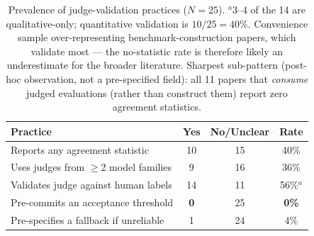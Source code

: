 \documentclass{article}
\begin{document}
\begin{table}[h]
\centering
\small
\begin{tabular}{lccc}
\toprule
Practice & Yes & No/Unclear & Rate \\
\midrule
Reports any agreement statistic & 10 & 15 & 40\% \\
Uses judges from $\ge$2 model families & 9 & 16 & 36\% \\
Validates judge against human labels & 14 & 11 & 56\%$^{a}$ \\
Pre-commits an acceptance threshold & \textbf{0} & 25 & \textbf{0\%} \\
Pre-specifies a fallback if unreliable & 1 & 24 & 4\% \\
\bottomrule
\end{tabular}
\caption{Prevalence of judge-validation practices ($N{=}25$).
$^{a}$3--4 of the 14 are qualitative-only; quantitative validation is
$10/25 = 40\%$. Convenience sample over-representing benchmark-construction
papers, which validate most --- the no-statistic rate is therefore
likely an underestimate for the broader literature. Sharpest
sub-pattern (post-hoc observation, not a pre-specified field): all 11
papers that \emph{consume} judged evaluations
(rather than construct them) report zero agreement statistics.}
\label{tab:survey}
\end{table}



\end{document}
